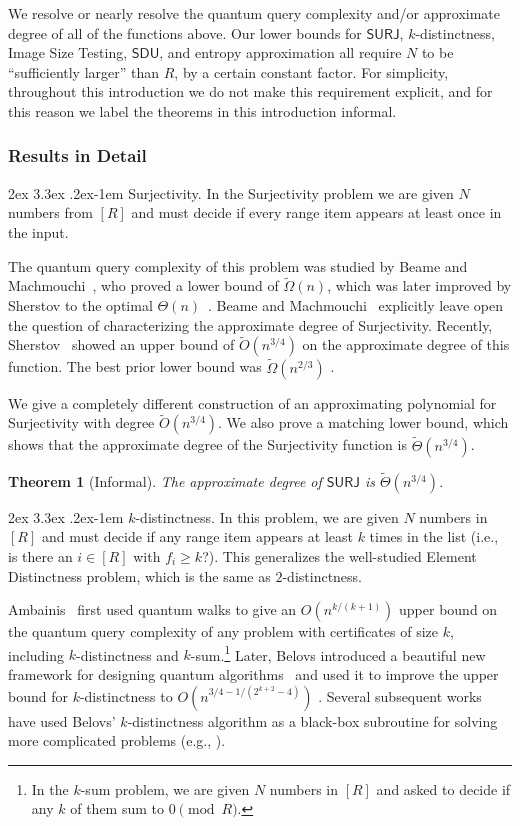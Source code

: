 \documentclass[11pt, letterpaper, fleqn]{article}
\makeatletter
\newcommand{\para}{
  \@startsection{paragraph}{4}
  {\z@}{2ex \@plus 3.3ex \@minus .2ex}{-1em}
  {\normalfont\normalsize\bfseries}
}
\newtheorem{theorem}{Theorem}
\theoremstyle{plain}
\newcommand{\SURJ}{\mathsf{ SURJ}}
\newcommand{\SDU}{\mathsf{ SDU}}
\newcommand{\tO}{\tilde{O}}
\newcommand{\tOmega}{\tilde{\Omega}}
\makeatother
\begin{document}
We resolve or nearly resolve the quantum query complexity and/or approximate degree of all of the functions above. Our lower bounds for $\SURJ$,
$k$-distinctness, Image Size Testing, $\SDU$, and entropy approximation all require $N$ to be ``sufficiently larger'' than $R$, by a certain constant  factor. For simplicity, throughout this introduction we do not make this requirement explicit, and for this reason we label
the theorems in this introduction informal.




\subsubsection{Results in Detail}

\para{Surjectivity.} In the Surjectivity problem we are given $N$ numbers from $[R]$ and must decide if every range item appears at least once in the input.


The quantum query complexity of this problem was studied by Beame and Machmouchi~\cite{beame}, who proved a lower bound of $\tOmega(n)$, which was later improved by Sherstov to the optimal $\Theta(n)$~\cite{sherstov15}.  Beame and Machmouchi~\cite{beame} explicitly leave open the question of characterizing the approximate degree of Surjectivity.
Recently, Sherstov~\cite{sherstovpersonal} showed an upper bound of $\tO(n^{3/4})$ on the approximate degree of this function.
The best prior lower bound was $\tilde{\Omega}(n^{2/3})$ \cite{aaronsonshi, adegsurj}. 

We give a completely different construction of an approximating polynomial for Surjectivity with degree $\tO(n^{3/4})$. We also prove a matching lower bound, which shows that the approximate degree of the Surjectivity function is $\tilde{\Theta}(n^{3/4})$. 

\begin{theorem}[Informal] \label{thm:introsurj} The approximate degree of $\SURJ$ is $\tilde{\Theta}(n^{3/4})$.
\end{theorem}


\para{$k$-distinctness.} In this problem, we are given $N$ numbers in $[R]$ and must decide if any range item appears at least $k$ times in the list (i.e., is there an $i\in [R]$ with $f_i \geq k$?). This generalizes the well-studied Element Distinctness problem, which is the same as $2$-distinctness.

Ambainis~\cite{ambainis} first used quantum walks to give an $O(n^{k/(k+1)})$ upper bound on the quantum query complexity of any problem with certificates of size $k$, including $k$-distinctness and $k$-sum.\footnote{In the $k$-sum problem, we are given $N$ numbers in $[R]$ and asked to decide if any $k$ of them sum to $0 \pmod R$.}
Later, Belovs introduced a beautiful new framework for designing quantum algorithms~\cite{belovsframework} and used it to improve the upper bound for $k$-distinctness to $O(n^{3/4-1/(2^{k + 2} - 4)})$ \cite{belovs}. 
Several subsequent works have used Belovs' $k$-distinctness algorithm as a black-box subroutine for solving more complicated problems (e.g., \cite{entropy, montanaro}).
\end{document}
